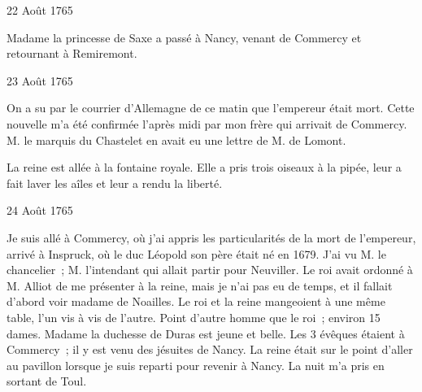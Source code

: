                      \begin{diary}{22 Août 1765}{}
                        
                        
                           Madame la princesse de Saxe a passé à
                           Nancy, venant de Commercy et retournant
                           à Remiremont. \bigskip
        
        
                     \end{diary}
                     \begin{diary}{23 Août 1765}{}
                        
                         On a su par le courrier d'Allemagne de
                           ce matin que l'empereur était mort. Cette
                           nouvelle m'a été confirmée l'après midi
                           par mon frère qui
                           arrivait de Commercy.
                           M. le marquis du Chastelet en avait eu une
                           lettre de M. de Lomont. \bigskip
        
        
                        
                           La reine est allée à
                              la fontaine royale. Elle
                           a pris trois oiseaux à la pipée, leur a fait
                           laver les aîles et leur a rendu la liberté. \bigskip
        
        
                     \end{diary}

                     \begin{diary}{24 Août 1765}{}
                        
                         Je suis allé à Commercy, où j'ai appris les
                           particularités de la mort de l'empereur, arrivé
                           à Inspruck, où le duc Léopold son père était
                           né
                           en 1679. J'ai vu M. le chancelier ; M.
                              l'intendant qui allait partir pour Neuviller.
                           Le roi avait ordonné à
                              M. Alliot de me présenter
                           à la reine, mais je
                           n'ai pas eu de temps, et
                           il fallait d'abord voir madame de Noailles. Le roi et
                           la reine mangeoient à
                           une même table, l'un
                           vis à vis de l'autre. Point d'autre homme que
                           le roi ; environ 15 dames.
                              Madame la duchesse de
                              Duras est jeune et belle. Les 3 évêques étaient
                           à Commercy ; il y est venu
                           des jésuites de Nancy.
                           La reine était
                           sur le point d'aller au pavillon
                           lorsque je suis reparti pour revenir à Nancy.
                           La nuit m'a pris en sortant de Toul. \bigskip
        
        
                     \end{diary}
                     
